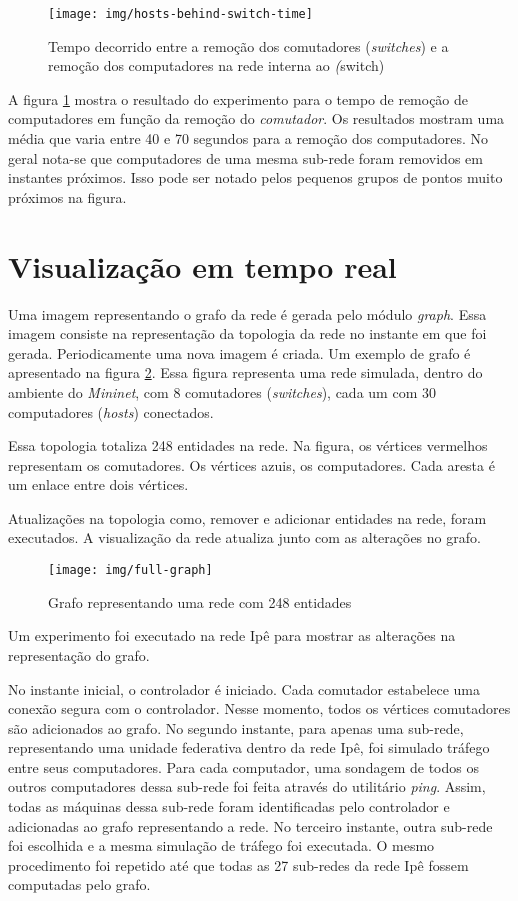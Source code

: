 \begin{figure}[h!]
    \centering
    \label{fig:hosts-behind-switch-time}
    \texttt{[image: img/hosts-behind-switch-time]}
    \caption{Tempo decorrido entre a remoção dos comutadores
    (\emph{switches}) e a remoção dos computadores na rede interna ao
    \emph(switch)}
\end{figure}

A figura \ref{fig:hosts-behind-switch-time} mostra o resultado do experimento
para o tempo de remoção de computadores em função da remoção do
\emph{comutador}.
Os resultados mostram uma média que varia entre 40 e 70 segundos para a
remoção dos computadores.
No geral nota-se que computadores de uma mesma sub-rede foram removidos em
instantes próximos.
Isso pode ser notado pelos pequenos grupos de pontos muito próximos na
figura.

\section{Visualização em tempo real}

Uma imagem representando o grafo da rede é gerada pelo módulo \emph{graph}.
Essa imagem consiste na representação da topologia da rede no instante
em que foi gerada.
Periodicamente uma nova imagem é criada.
Um exemplo de grafo é apresentado na figura \ref{fig:full-graph}.
Essa figura representa uma rede simulada, dentro do ambiente do
\emph{Mininet}, com 8 comutadores (\emph{switches}), cada um com 30
computadores (\emph{hosts}) conectados.

Essa topologia totaliza 248 entidades na rede.
Na figura, os vértices vermelhos representam os comutadores.
Os vértices azuis, os computadores.
Cada aresta é um enlace entre dois vértices.

Atualizações na topologia como, remover e adicionar entidades na rede, foram
executados.
A visualização da rede atualiza junto com as alterações no grafo.

\begin{figure}[h!]
    \centering
    \texttt{[image: img/full-graph]}
    \caption{Grafo representando uma rede com 248 entidades}
    \label{fig:full-graph}
\end{figure}
\break
Um experimento foi executado na rede Ipê para mostrar as alterações na
representação do grafo.

No instante inicial, o controlador é iniciado.
Cada comutador estabelece uma conexão segura com o controlador.
Nesse momento, todos os vértices comutadores são adicionados ao grafo.
No segundo instante, para apenas uma sub-rede, representando uma unidade
federativa dentro da rede Ipê, foi simulado tráfego entre seus computadores.
Para cada computador, uma sondagem de todos os outros computadores dessa
sub-rede foi feita através do utilitário \emph{ping}.
Assim, todas as máquinas dessa sub-rede foram identificadas pelo controlador
e adicionadas ao grafo representando a rede.
No terceiro instante, outra sub-rede foi escolhida e a mesma simulação de
tráfego foi executada.
O mesmo procedimento foi repetido até que todas as 27 sub-redes da rede Ipê
fossem computadas pelo grafo.

